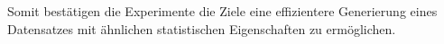 \documentclass[sigconf]{acmart}
\begin{document}
Somit bestätigen die Experimente die Ziele eine effizientere Generierung eines Datensatzes mit ähnlichen statistischen Eigenschaften zu ermöglichen.   












\end{document}
